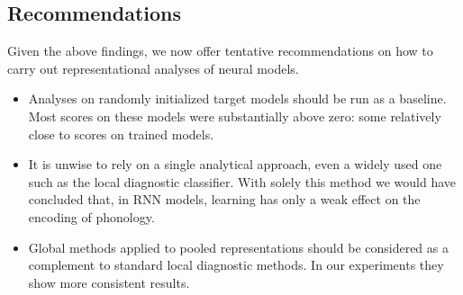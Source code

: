 \subsection{Recommendations}
\label{sec:recommendations}
Given the above findings, we now offer tentative recommendations on
how to carry out representational analyses of neural models.
\begin{itemize}
\item Analyses on randomly initialized target models should be run as a baseline.
  Most scores on these models were substantially
  above zero: some relatively close to scores on trained models.
\item It is unwise to rely on a single analytical approach, even a
  widely used one such as the local diagnostic classifier. With solely this method
  we would have concluded that, in RNN models, learning has only a weak effect on the
  encoding of phonology.
\item Global methods applied to pooled representations should be
  considered as a complement to standard local diagnostic methods. In
  our experiments they show more consistent results.
\end{itemize}

